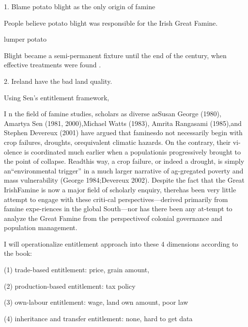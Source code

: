 1. Blame potato blight as the only origin of famine

People believe potato blight was responsible for the Irish Great Famine. 

lumper potato

Blight became a semi-permanent fixture until the end of the century, when effective treatments were found \citep{o1994economic}.

2. Ireland have the bad land quality.



Using Sen's entitlement framework, \citep{fraser2003social}

I n the ﬁeld of famine studies, scholars as diverse asSusan George (1980), Amartya Sen (1981, 2000),Michael Watts (1983), Amrita Rangasami (1985),and Stephen Devereux (2001) have argued that faminesdo not necessarily begin with crop failures, droughts, orequivalent climatic hazards. On the contrary, their vi-olence is coordinated much earlier when a populationis progressively brought to the point of collapse. Readthis way, a crop failure, or indeed a drought, is simply an“environmental trigger” in a much larger narrative of ag-gregated poverty and mass vulnerability (George 1984;Devereux 2002). Despite the fact that the Great IrishFamine is now a major ﬁeld of scholarly enquiry, therehas been very little attempt to engage with these criti-cal perspectives—derived primarily from famine expe-riences in the global South—nor has there been any at-tempt to analyze the Great Famine from the perspectiveof colonial governance and population management. \citep{nally2008coming}


I will operationalize entitlement approach into these 4 dimensions according to the book:

(1) trade-based entitlement: price, grain amount, 

(2) production-based entitlement: tax policy

(3) own-labour entitlement: wage, land own amount, poor law

(4) inheritance and transfer entitlement: none, hard to get data






